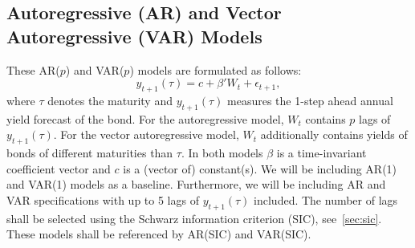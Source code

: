 \subsection{Autoregressive (AR) and Vector Autoregressive (VAR) Models}
\label{sec:arvar}
These AR($p$) and VAR($p$) models are formulated as follows:
\begin{equation}
	y_{t+1}(\tau) = c + \beta' W_t + \epsilon_{t+1},
\end{equation}
where $\tau$ denotes the maturity and $y_{t+1}(\tau)$ measures the 1-step ahead annual yield forecast of the bond. 
For the autoregressive model, $W_t$ contains $p$ lags of $y_{t+1}(\tau)$. For the vector autoregressive model, $W_t$ additionally contains yields of bonds of different maturities than $\tau$. 
In both models $\beta$ is a time-invariant coefficient vector and $c$ is a (vector of) constant(s). 
We will be including AR(1) and VAR(1) models as a baseline. 
Furthermore, we will be including AR and VAR specifications with up to 5 lags of $y_{t+1}(\tau)$ included. 
The number of lags shall be selected using the Schwarz information criterion (SIC), see~\cref{sec:sic}. 
These models shall be referenced by AR(SIC) and VAR(SIC). 

